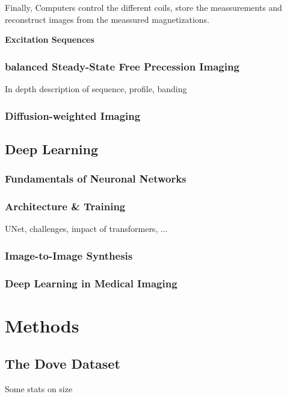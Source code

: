 

Finally, Computers control the different coils, store the meassurements and reconstruct images from the meassured magnetizations.

\textbf{Excitation Sequences} \\

\subsection{balanced Steady-State Free Precession Imaging}

In depth description of sequence, profile, banding

\subsection{Diffusion-weighted Imaging}

\section{Deep Learning}
\subsection{Fundamentals of Neuronal Networks}

\subsection{Architecture \& Training}
UNet, challenges, impact of transformers, ...

\subsection{Image-to-Image Synthesis}

\subsection{Deep Learning in Medical Imaging}



\chapter{Methods}\label{\positionnumber} 
\section{The Dove Dataset}
Some stats on size 
